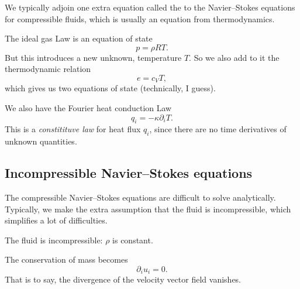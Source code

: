 \begin{definition}
We typically adjoin one extra equation called the 
to the Navier--Stokes equations for compressible fluids, which is
usually an equation from thermodynamics.
\end{definition}

\begin{example}
The ideal gas Law is an equation of state
\begin{equation}
p=\rho R T.
\end{equation}
But this  introduces a new unknown, temperature $T$. So we also add to
it the thermodynamic relation
\begin{equation}
e = c_{V}T,
\end{equation}
which gives us two equations of state (technically, I guess).
\end{example}

\begin{example}
We also have the Fourier heat conduction Law
\begin{equation}
q_{i}=-\kappa\partial_{i}T.
\end{equation}
This is a \emph{constitituve law} for heat flux $q_{i}$, since there
are no time derivatives of unknown quantities.
\end{example}

\subsection{Incompressible Navier--Stokes equations}

\begin{remark}
The compressible Navier--Stokes equations are difficult to solve
analytically. Typically, we make the extra assumption that the fluid
is incompressible, which simplifies a lot of difficulties.
\end{remark}

\begin{assume}
The fluid is incompressible: $\rho$ is constant.
\end{assume}

\begin{proposition}
The conservation of mass becomes
\begin{equation}\label{eq:lec10:incompressible:conservation-of-mass}
\partial_{i}u_{i}=0.
\end{equation}
That is to say, the divergence of the velocity vector field vanishes.
\end{proposition}

